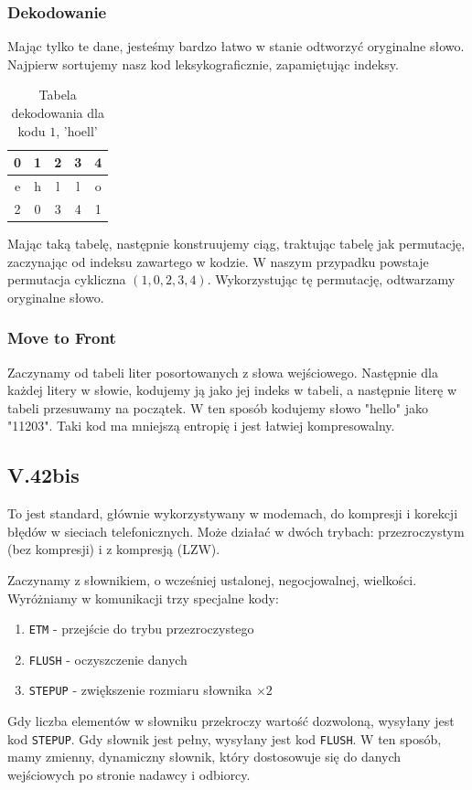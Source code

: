 \documentclass{../notatki}
\begin{document}
\subsubsection{Dekodowanie}

Mając tylko te dane, jesteśmy bardzo łatwo w stanie odtworzyć
oryginalne słowo. Najpierw sortujemy nasz kod leksykograficznie, zapamiętując
indeksy.
\begin{table}[h]
  \centering
  \begin{tabular}{|c|c|c|c|c|}
    \hline
    \rowcolor{gray!50}
    0 & 1 & 2 & 3 & 4 \\
    \hline
    e & h & l & l & o \\
    \hline
    2 & 0 & 3 & 4 & 1 \\
    \hline
  \end{tabular}
  \caption{Tabela dekodowania dla kodu $1$, 'hoell'}
\end{table}
Mając taką tabelę, następnie konstruujemy ciąg, traktując tabelę jak
permutację, zaczynając od indeksu zawartego w kodzie.
W naszym przypadku powstaje permutacja cykliczna $(1, 0, 2, 3, 4)$.
Wykorzystując tę permutację, odtwarzamy oryginalne słowo.

\subsubsection{Move to Front}

Zaczynamy od tabeli liter posortowanych z słowa wejściowego. Następnie
dla każdej litery w słowie, kodujemy ją jako jej indeks w tabeli, a
następnie literę w tabeli przesuwamy na początek. W ten sposób
kodujemy słowo "hello" jako "11203". Taki kod ma mniejszą entropię i
jest łatwiej kompresowalny.

\subsection{V.42bis}

To jest standard, głównie wykorzystywany w modemach, do kompresji i korekcji
błędów w sieciach telefonicznych. Może działać w dwóch trybach: przezroczystym
(bez kompresji) i z kompresją (LZW).

Zaczynamy z słownikiem, o wcześniej ustalonej, negocjowalnej, wielkości.
Wyróżniamy w komunikacji trzy specjalne kody:
\begin{enumerate}
  \item \texttt{ETM} - przejście do trybu przezroczystego
  \item \texttt{FLUSH} - oczyszczenie danych
  \item \texttt{STEPUP} - zwiększenie rozmiaru słownika $\times 2$
\end{enumerate}
Gdy liczba elementów w słowniku przekroczy wartość dozwoloną, wysyłany jest
kod \texttt{STEPUP}. Gdy słownik jest pełny, wysyłany jest kod \texttt{FLUSH}.
W ten sposób, mamy zmienny, dynamiczny słownik, który dostosowuje się do
danych wejściowych po stronie nadawcy i odbiorcy.
\end{document}
